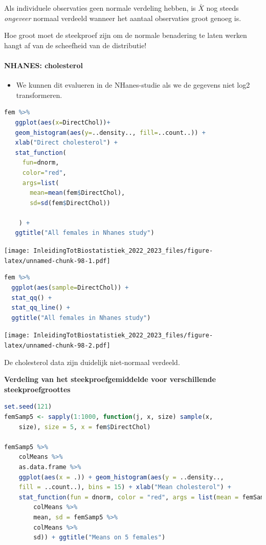 \documentclass[
  12pt,dutch,coursenotes]{book}
\providecommand{\tightlist}{%
  \setlength{\itemsep}{0pt}\setlength{\parskip}{0pt}}
\begin{document}
Als individuele observaties geen normale verdeling hebben, is \(\bar X\) nog steeds \textit{ongeveer} normaal verdeeld
wanneer het aantaal observaties groot genoeg is.

Hoe groot moet de steekproef zijn om de normale benadering te laten werken hangt af van de scheefheid van de distributie!

\hypertarget{nhanes-cholesterol-1}{%
\paragraph{NHANES: cholesterol}\label{nhanes-cholesterol-1}}

\begin{itemize}
\tightlist
\item
  We kunnen dit evalueren in de NHanes-studie als we de gegevens niet log2 transformeren.
\end{itemize}

\begin{lstlisting}[language=R]
fem %>%
   ggplot(aes(x=DirectChol))+
   geom_histogram(aes(y=..density.., fill=..count..)) +
   xlab("Direct cholesterol") +
   stat_function(
     fun=dnorm,
     color="red",
     args=list(
       mean=mean(fem$DirectChol),
       sd=sd(fem$DirectChol))

    ) +
   ggtitle("All females in Nhanes study")
\end{lstlisting}

\texttt{[image: InleidingTotBiostatistiek\_2022\_2023\_files/figure-latex/unnamed-chunk-98-1.pdf]}

\begin{lstlisting}[language=R]
 fem %>%
  ggplot(aes(sample=DirectChol)) +
  stat_qq() +
  stat_qq_line() +
  ggtitle("All females in Nhanes study")
\end{lstlisting}

\texttt{[image: InleidingTotBiostatistiek\_2022\_2023\_files/figure-latex/unnamed-chunk-98-2.pdf]}

De cholesterol data zijn duidelijk niet-normaal verdeeld.

\textbf{Verdeling van het steekproefgemiddelde voor verschillende steekproefgroottes}

\begin{lstlisting}[language=R]
set.seed(121)
femSamp5 <- sapply(1:1000, function(j, x, size) sample(x,
    size), size = 5, x = fem$DirectChol)

femSamp5 %>%
    colMeans %>%
    as.data.frame %>%
    ggplot(aes(x = .)) + geom_histogram(aes(y = ..density..,
    fill = ..count..), bins = 15) + xlab("Mean cholesterol") +
    stat_function(fun = dnorm, color = "red", args = list(mean = femSamp5 %>%
        colMeans %>%
        mean, sd = femSamp5 %>%
        colMeans %>%
        sd)) + ggtitle("Means on 5 females")
\end{lstlisting}
\end{document}
